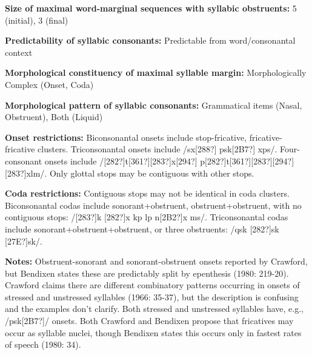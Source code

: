 \begin{styleBody}
\textbf{Size of maximal word{}-marginal sequences with syllabic obstruents:} 5 (initial), 3 (final)
\end{styleBody}

\begin{styleBody}
\textbf{Predictability of syllabic consonants:} Predictable from word/consonantal context
\end{styleBody}

\begin{styleBody}
\textbf{Morphological constituency of maximal syllable margin:} Morphologically Complex (Onset, Coda)
\end{styleBody}

\begin{styleBody}
\textbf{Morphological pattern of syllabic consonants:} Grammatical items (Nasal, Obstruent), Both (Liquid)
\end{styleBody}

\begin{styleBody}
\textbf{Onset restrictions: }Biconsonantal onsets include stop-fricative, fricative-fricative clusters. Triconsonantal onsets include /sx[288?] psk[2B7?] xps/. Four-consonant onsets include /[282?]t[361?][283?]x[294?] p[282?]t[361?][283?][294?] [283?]xlm/. Only glottal stops may be contiguous with other stops.
\end{styleBody}

\begin{styleBody}
\textbf{Coda restrictions: }Contiguous stops may not be identical in coda clusters. Biconsonantal codas include sonorant+obstruent, obstruent+obstruent, with no contiguous stops: /[283?]k [282?]x kp lp n[2B2?]x ms/. Triconsonantal codas include sonorant+obstruent+obstruent, or three obstruents: /qsk [282?]sk [27E?]sk/.
\end{styleBody}

\begin{styleBody}
\textbf{Notes: }Obstruent-sonorant and sonorant-obstruent onsets reported by Crawford, but Bendixen states these are predictably split by epenthesis (1980: 219-20). Crawford claims there are different combinatory patterns occurring in onsets of stressed and unstressed syllables (1966: 35-37), but the description is confusing and the examples don’t clarify. Both stressed and unstressed syllables have, e.g., /psk[2B7?]/ onsets. Both Crawford and Bendixen propose that fricatives may occur as syllable nuclei, though Bendixen states this occurs only in fastest rates of speech (1980: 34).
\end{styleBody}

